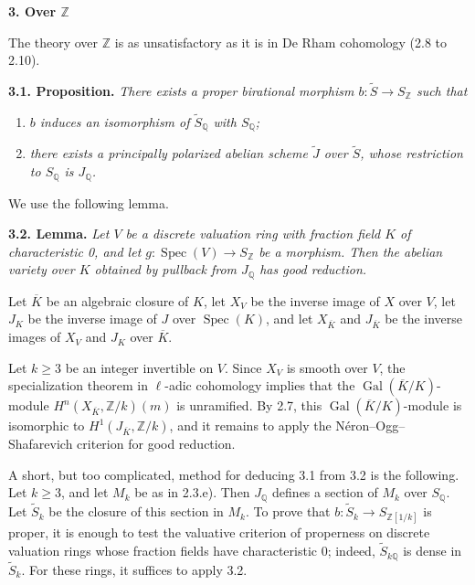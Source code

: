\documentclass[10pt]{article}
\newcommand{\Q}{\mathbb Q}
\newcommand{\Z}{\mathbb Z}
\newcommand{\Spec}{\operatorname{Spec}}
\newcommand{\Gal}{\operatorname{Gal}}
\begin{document}
\begin{center}\bfseries 3. Over \(\Z\)\end{center}

The theory over \(\Z\) is as unsatisfactory as it is in De Rham cohomology (2.8 to 2.10).

\noindent\textbf{3.1. Proposition.} \emph{There exists a proper birational morphism \(b:\widetilde S\longrightarrow S_\Z\) such that}
\begin{enumerate}[label=\alph*)]
\item \emph{\(b\) induces an isomorphism of \(\widetilde S_\Q\) with \(S_\Q\);}
\item \emph{there exists a principally polarized abelian scheme \(\widetilde J\) over \(\widetilde S\), whose restriction to \(S_\Q\) is \(J_\Q\).}
\end{enumerate}

We use the following lemma.

\noindent\textbf{3.2. Lemma.} \emph{Let \(V\) be a discrete valuation ring with fraction field \(K\) of characteristic 0, and let \(g:\Spec(V)\longrightarrow S_\Z\) be a morphism. Then the abelian variety over \(K\) obtained by pullback from \(J_\Q\) has good reduction.}

Let \(\overline K\) be an algebraic closure of \(K\), let \(X_V\) be the inverse image of \(X\) over \(V\), let \(J_K\) be the inverse image of \(J\) over \(\Spec(K)\), and let \(X_{\overline K}\) and \(J_{\overline K}\) be the inverse images of \(X_V\) and \(J_K\) over \(\overline K\).

Let \(k\geq3\) be an integer invertible on \(V\). Since \(X_V\) is smooth over \(V\), the specialization theorem in \(\ell\)-adic cohomology implies that the \(\Gal(\overline K/K)\)-module \(H^n(X_{\overline K},\Z/k)(m)\) is unramified. By 2.7, this \(\Gal(\overline K/K)\)-module is isomorphic to \(H^1(J_{\overline K},\Z/k)\), and it remains to apply the Néron--Ogg--Shafarevich criterion for good reduction.

A short, but too complicated, method for deducing 3.1 from 3.2 is the following. Let \(k\geq3\), and let \(M_k\) be as in 2.3.e). Then \(J_\Q\) defines a section of \(M_k\) over \(S_\Q\). Let \(\widetilde S_k\) be the closure of this section in \(M_k\). To prove that \(b:\widetilde S_k\longrightarrow S_{\Z[1/k]}\) is proper, it is enough to test the valuative criterion of properness on discrete valuation rings whose fraction fields have characteristic 0; indeed, \(\widetilde S_{k\Q}\) is dense in \(\widetilde S_k\). For these rings, it suffices to apply 3.2.
\end{document}
